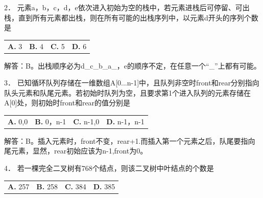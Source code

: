 \documentclass[UTF8,11pt]{ctexart}
\begin{document}
2． 元素a，b，c，d，e依次进入初始为空的栈中，若元素进栈后可停留、可出栈，直到所有元素都出栈，则在所有可能的出栈序列中，以元素d开头的序列个数是


\begin{center}\begin{tabular}{>{\raggedright\arraybackslash}p{\dimexpr(\linewidth-8\tabcolsep)/4\relax}>{\raggedright\arraybackslash}p{\dimexpr(\linewidth-8\tabcolsep)/4\relax}>{\raggedright\arraybackslash}p{\dimexpr(\linewidth-8\tabcolsep)/4\relax}>{\raggedright\arraybackslash}p{\dimexpr(\linewidth-8\tabcolsep)/4\relax}}
\textbf{A.} 3 & \textbf{B.} 4 & \textbf{C.} 5 & \textbf{D.} 6\\[.35em]\end{tabular}\end{center}

解答：B。出栈顺序必为d\_c\_b\_a\_，e的顺序不定，在任意一个“\_”上都有可能。


3． 已知循环队列存储在一维数组A[0...n-1]中，且队列非空时front和rear分别指向队头元素和队尾元素。若初始时队列为空，且要求第1个进入队列的元素存储在A[0]处，则初始时front和rear的值分别是


\begin{center}\begin{tabular}{>{\raggedright\arraybackslash}p{\dimexpr(\linewidth-8\tabcolsep)/4\relax}>{\raggedright\arraybackslash}p{\dimexpr(\linewidth-8\tabcolsep)/4\relax}>{\raggedright\arraybackslash}p{\dimexpr(\linewidth-8\tabcolsep)/4\relax}>{\raggedright\arraybackslash}p{\dimexpr(\linewidth-8\tabcolsep)/4\relax}}
\textbf{A.} 0,0 & \textbf{B.} 0，n-1 & \textbf{C.} n-1,0 & \textbf{D.} n-1，n-1\\[.35em]\end{tabular}\end{center}

解答：B。插入元素时，front不变，rear+1.而插入第一个元素之后，队尾要指向尾元素，显然，rear初始应该为n-1,front为0。


4． 若一棵完全二叉树有768个结点，则该二叉树中叶结点的个数是


\begin{center}\begin{tabular}{>{\raggedright\arraybackslash}p{\dimexpr(\linewidth-8\tabcolsep)/4\relax}>{\raggedright\arraybackslash}p{\dimexpr(\linewidth-8\tabcolsep)/4\relax}>{\raggedright\arraybackslash}p{\dimexpr(\linewidth-8\tabcolsep)/4\relax}>{\raggedright\arraybackslash}p{\dimexpr(\linewidth-8\tabcolsep)/4\relax}}
\textbf{A.} 257 & \textbf{B.} 258 & \textbf{C.} 384 & \textbf{D.} 385\\[.35em]\end{tabular}\end{center}
\end{document}
